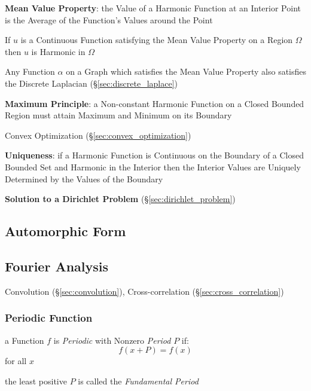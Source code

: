 \textbf{Mean Value Property}: the Value of a Harmonic Function at an
Interior Point is the Average of the Function's Values around the
Point

If $u$ is a Continuous Function satisfying the Mean Value Property on
a Region $\Omega$ then $u$ is Harmonic in $\Omega$

Any Function $\alpha$ on a Graph which satisfies the Mean Value
Property also satisfies the Discrete Laplacian
(\S\ref{sec:discrete_laplace})


\textbf{Maximum Principle}: a Non-constant Harmonic Function on a
Closed Bounded Region must attain Maximum and Minimum on its Boundary

Convex Optimization (\S\ref{sec:convex_optimization})


\textbf{Uniqueness}: if a Harmonic Function is Continuous on the
Boundary of a Closed Bounded Set and Harmonic in the Interior then the
Interior Values are Uniquely Determined by the Values of the Boundary


\textbf{Solution to a Dirichlet Problem}
(\S\ref{sec:dirichlet_problem})



\subsection{Automorphic Form}\label{sec:automorphic_form}

\subsection{Fourier Analysis}\label{sec:fourier_analysis}

\fist Convolution (\S\ref{sec:convolution}), Cross-correlation
(\S\ref{sec:cross_correlation})



\subsubsection{Periodic Function}\label{sec:periodic_function}

a Function $f$ is \emph{Periodic} with Nonzero \emph{Period} $P$ if:
\[
  f(x+P) = f(x)
\]
for all $x$

the least positive $P$ is called the \emph{Fundamental Period}

